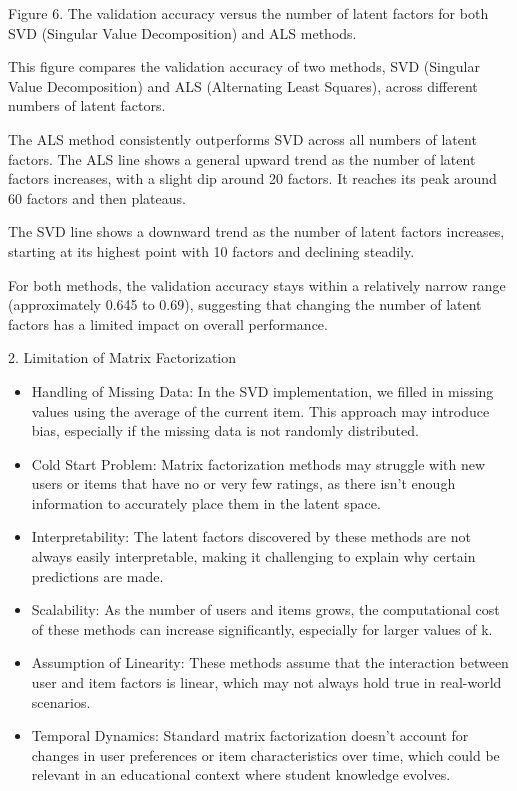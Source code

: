 \documentclass[letterpaper]{article}
\begin{document}
{\centering
Figure 6. The validation accuracy versus the number of latent factors for both SVD (Singular Value Decomposition) and
ALS methods.
\par}


\bigskip

This figure compares the validation accuracy of two methods, SVD (Singular Value Decomposition) and ALS (Alternating
Least Squares), across different numbers of latent factors. 

The ALS method consistently outperforms SVD across all numbers of latent factors. The ALS line shows a general upward
trend as the number of latent factors increases, with a slight dip around 20 factors. It reaches its peak around 60
factors and then plateaus.

The SVD line shows a downward trend as the number of latent factors increases, starting at its highest point with 10
factors and declining steadily.

For both methods, the validation accuracy stays within a relatively narrow range (approximately 0.645 to 0.69),
suggesting that changing the number of latent factors has a limited impact on overall performance.


\bigskip


\bigskip

2. Limitation of Matrix Factorization

\begin{itemize}[series=listWWNumvii,label=[F0B7?]]
\item Handling of Missing Data: In the SVD implementation, we filled in missing values using the average of the current
item. This approach may introduce bias, especially if the missing data is not randomly distributed.
\item Cold Start Problem: Matrix factorization methods may struggle with new users or items that have no or very few
ratings, as there isn't enough information to accurately place them in the latent space.
\item Interpretability: The latent factors discovered by these methods are not always easily interpretable, making it
challenging to explain why certain predictions are made.
\item Scalability: As the number of users and items grows, the computational cost of these methods can increase
significantly, especially for larger values of k.
\item Assumption of Linearity: These methods assume that the interaction between user and item factors is linear, which
may not always hold true in real-world scenarios.
\item Temporal Dynamics: Standard matrix factorization doesn't account for changes in user preferences or item
characteristics over time, which could be relevant in an educational context where student knowledge evolves.
\end{itemize}
\end{document}
